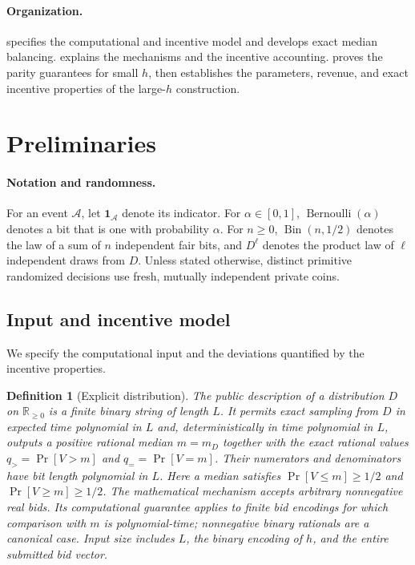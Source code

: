 \documentclass[11pt]{article}
\newtheorem{definition}[lemma]{Definition}
\begin{document}
\paragraph{Organization.}
 specifies the computational and incentive model and
develops exact median balancing.   explains the mechanisms
and the incentive accounting.   proves the parity
guarantees for small $h$, then establishes the parameters, revenue, and exact
incentive properties of the large-$h$ construction.

\section{Preliminaries}
\label{sec:preliminaries}

\paragraph{Notation and randomness.}
For an event $\mathcal A$, let $\mathbf{1}_{\mathcal A}$ denote its indicator.
For $\alpha\in[0,1]$, $\operatorname{Bernoulli}(\alpha)$ denotes a bit that is
one with probability $\alpha$.  For $n\ge0$,
$\operatorname{Bin}(n,1/2)$ denotes the law of a sum of $n$ independent fair
bits, and $D^\ell$ denotes the product law of $\ell$ independent draws from
$D$.  Unless stated otherwise, distinct primitive randomized decisions use
fresh, mutually independent private coins.

\subsection{Input and incentive model}

We specify the computational input and the deviations quantified by the
incentive properties.

\begin{definition}[Explicit distribution]
\label{def:explicit-distribution}
The public description of a distribution $D$ on $\mathbb{R}_{\ge0}$ is a
finite binary string of length $L$.  It
permits exact sampling from $D$ in expected time polynomial in $L$ and,
deterministically in time polynomial in $L$, outputs a positive rational median
$m=m_D$ together with the exact rational values
$q_{>}=\Pr[V>m]$ and $q_{=}=\Pr[V=m]$.  Their numerators and denominators have
bit length polynomial in $L$.  Here a median satisfies
$\Pr[V\le m]\ge1/2$ and $\Pr[V\ge m]\ge1/2$.  The mathematical mechanism
accepts arbitrary nonnegative real bids.  Its computational guarantee applies
to finite bid encodings for which comparison with $m$ is polynomial-time;
nonnegative binary rationals are a canonical case.  Input size includes $L$,
the binary encoding of $h$, and the entire submitted bid vector.
\end{definition}
\end{document}
